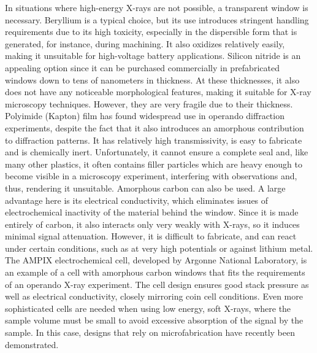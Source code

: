 \documentclass[journal=cmatex,manuscript=perspective]{achemso}
\begin{document}
In situations where high-energy X-rays are not possible, a transparent
window is necessary. Beryllium is a typical choice, but its use
introduces stringent handling requirements due to its high toxicity,
especially in the dispersible form that is generated, for instance,
during machining. It also oxidizes relatively easily, making it
unsuitable for high-voltage battery applications. Silicon nitride is
an appealing option since it can be purchased commercially in
prefabricated windows down to tens of nanometers in thickness. At
these thicknesses, it also does not have any noticeable morphological
features, making it suitable for X-ray microscopy techniques. However,
they are very fragile due to their thickness. Polyimide (Kapton) film
has found widespread use in operando diffraction experiments, despite
the fact that it also introduces an amorphous contribution to
diffraction patterns. It has relatively high transmissivity, is easy
to fabricate and is chemically inert. Unfortunately, it cannot ensure
a complete seal and, like many other plastics, it often contains
filler particles which are heavy enough to become visible in a
microscopy experiment, interfering with observations and, thus,
rendering it unsuitable. Amorphous carbon can also be used. A large
advantage here is its electrical conductivity, which eliminates issues
of electrochemical inactivity of the material behind the window. Since
it is made entirely of carbon, it also interacts only very weakly with
X-rays, so it induces minimal signal attenuation. However, it is
difficult to fabricate, and can react under certain conditions, such
as at very high potentials or against lithium metal. The AMPIX
electrochemical cell, developed by Argonne National Laboratory, is an
example of a cell with amorphous carbon windows that fits the
requirements of an operando X-ray experiment. The cell design ensures
good stack pressure as well as electrical conductivity, closely
mirroring coin cell
conditions\cite{borkiewicz2012,borkiewicz2015}. Even more
sophisticated cells are needed when using low energy, soft X-rays,
where the sample volume must be small to avoid excessive absorption of
the signal by the sample. In this case, designs that rely on
microfabrication have recently been demonstrated\cite{lim2016}.
\end{document}
